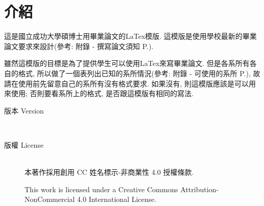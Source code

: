 
\section{介紹}

這是國立成功大學碩博士用畢業論文的LaTex模版. 這模版是使用學校最新的畢業論文要求來設計(參考: 附錄 - 撰寫論文須知 P.\pageref{appendix:thesis-spec}).

雖然這模版的目標是為了提供學生可以使用LaTex來寫畢業論文. 但是各系所有各自的格式, 所以做了一個表列出已知的系所情況(參考: 附錄 - 可使用的系所 P.\pageref{appendix:acceptable-dept}), 故請在使用前先留意自己的系所有沒有格式要求. 如果沒有, 則這模版應該是可以用來使用; 否則要看系所上的格式, 是否跟這模版有相同的寫法.



\begin{description}
  \item[版本 Version] \hfill \\
    \ThisThesisVersion

  \item[版權 License] \hfill \\
    本著作採用創用 CC 姓名標示-非商業性 4.0 授權條款.

    This work is licensed under a Creative Commons Attribution-NonCommercial 4.0 International License.

\end{description}

\EndChapter

